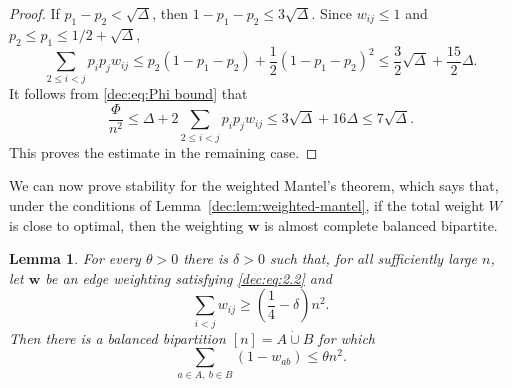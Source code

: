 \documentclass[11pt]{article}
\numberwithin{equation}{section}
\newtheorem{lemma}[theorem]{Lemma}
\theoremstyle{remark}
\newcommand{\dotcupunion}{\mathbin{\dot\cup}}
\begin{document}
\begin{proof}
If \(p_1-p_2<\sqrt{\Delta}\), then \(1-p_1-p_2\le3\sqrt{\Delta}\). Since \(w_{ij}\le1\) and \(p_2\le p_1\le1/2+\sqrt{\Delta}\),
\begin{equation*}
 \sum_{2\le i<j}p_ip_jw_{ij}\le p_2(1-p_1-p_2)+\frac{1}{2}(1-p_1-p_2)^2\le \frac32\sqrt{\Delta}+\frac{15}{2}\Delta.
\end{equation*}
It follows from \eqref{dec:eq:Phi bound} that
\begin{equation*}
 \frac{\Phi}{n^2}\le \Delta+2\sum_{2\le i<j}p_ip_jw_{ij}\le3\sqrt{\Delta}+16\Delta\le7\sqrt{\Delta}.
\end{equation*}
This proves the estimate in the remaining case.
\end{proof}

We can now prove stability for the weighted Mantel's theorem, which says that,
under the conditions of Lemma~\ref{dec:lem:weighted-mantel}, if the total weight \(W\) is close to optimal,
then the weighting \(\mathbf w\) is almost complete balanced bipartite.

\begin{lemma}
  \label{dec:lem:weighted-stability}
For every \(\theta>0\) there is \(\delta>0\) such that, for all
sufficiently large \(n\), let \(\mathbf{w}\) be an edge weighting
satisfying \emph{\eqref{dec:eq:2.2}} and
\begin{equation}\label{dec:eq:2.6}
  \sum_{i<j}w_{ij}\ge \left(\frac{1}{4}-\delta\right)n^2.
\end{equation}
Then there is a balanced bipartition \([n]=A\dotcupunion B\) for which
\begin{equation}\label{dec:eq:2.7}
  \sum_{a\in A,\ b\in B}(1-w_{ab})\le\theta n^2.
\end{equation}
\end{lemma}
\end{document}
